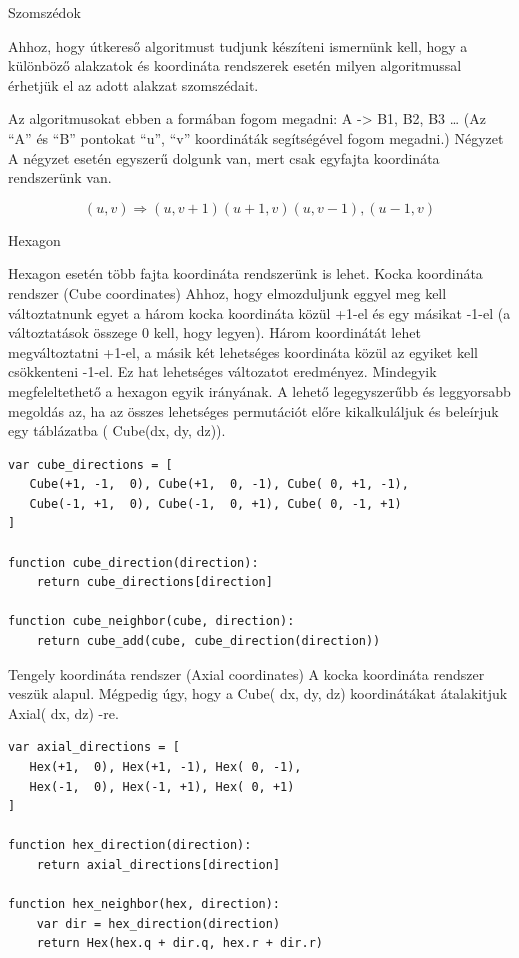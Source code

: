 Szomszédok

Ahhoz, hogy útkereső algoritmust tudjunk készíteni ismernünk kell, hogy a különböző alakzatok és koordináta rendszerek esetén milyen algoritmussal érhetjük el az adott alakzat szomszédait. 

Az algoritmusokat ebben a formában fogom megadni: A -> B1, B2, B3 …
(Az “A” és “B” pontokat “u”, “v” koordináták segítségével fogom megadni.)
Négyzet
A négyzet esetén egyszerű dolgunk van, mert csak egyfajta koordináta rendszerünk van.

$$
(u,v) \Rightarrow (u,v+1) (u+1,v) (u,v-1), (u-1,v)
$$

Hexagon

Hexagon esetén több fajta koordináta rendszerünk is lehet.
Kocka koordináta rendszer (Cube coordinates)
Ahhoz, hogy elmozduljunk eggyel meg kell változtatnunk egyet a három kocka koordináta közül +1-el és egy másikat -1-el (a változtatások összege 0 kell, hogy legyen). Három koordinátát lehet megváltoztatni +1-el, a másik két lehetséges koordináta közül az egyiket kell csökkenteni -1-el. Ez hat lehetséges változatot eredményez. Mindegyik megfeleltethető a hexagon egyik irányának. A lehető legegyszerűbb és leggyorsabb megoldás az, ha az összes lehetséges permutációt előre kikalkuláljuk és beleírjuk egy táblázatba ( Cube(dx, dy, dz)).

\begin{verbatim}
var cube_directions = [
   Cube(+1, -1,  0), Cube(+1,  0, -1), Cube( 0, +1, -1),
   Cube(-1, +1,  0), Cube(-1,  0, +1), Cube( 0, -1, +1)
]

function cube_direction(direction):
    return cube_directions[direction]

function cube_neighbor(cube, direction):
    return cube_add(cube, cube_direction(direction))
\end{verbatim}

Tengely koordináta rendszer (Axial coordinates)
A kocka koordináta rendszer veszük alapul. Mégpedig úgy, hogy a Cube( dx, dy, dz) koordinátákat átalakitjuk Axial( dx, dz) -re.

\begin{verbatim}
var axial_directions = [
   Hex(+1,  0), Hex(+1, -1), Hex( 0, -1),
   Hex(-1,  0), Hex(-1, +1), Hex( 0, +1)
]

function hex_direction(direction):
    return axial_directions[direction]

function hex_neighbor(hex, direction):
    var dir = hex_direction(direction)
    return Hex(hex.q + dir.q, hex.r + dir.r)
\end{verbatim}

